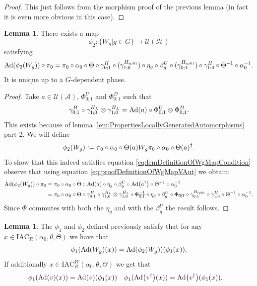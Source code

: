\documentclass[12pt,a4paper,twoside]{article}
\newcommand{\stkout}[1]{\ifmmode\text{\sout{\ensuremath{#1}}}\else\sout{#1}\fi}
\newcommand{\IAC}{\textrm{IAC}}
\newcommand{\defeq}{\vcentcolon=}
\let\originalleft\left
\let\originalright\right
\renewcommand{\left}{\mathopen{}\mathclose\bgroup\originalleft}
\renewcommand{\right}{\aftergroup\egroup\originalright}
\newcommand{\UU}{\mathcal U}
\newcommand{\HH}{\mathcal H}
\renewcommand{\AA}{\mathcal A}
\newcommand{\Ad}[1]{\textrm{Ad}\left(#1\right)}
\theoremstyle{definition}
\newtheorem{lemma}[theorem]{Lemma}
\numberwithin{equation}{section}
\begin{document}
\begin{proof}
	This just follows from the morphism proof of the previous lemma (in fact it is even more obvious in this case).
\end{proof}
\begin{lemma}\label{lem:DefinitionOfWgMap}
	There exists a map
	\begin{equation}
		\phi_2:\{W_g|g\in G\}\rightarrow \UU(\HH)
	\end{equation}
	satisfying
	\begin{equation}\label{eq:lemDefinitionOfWgMapCondition}
		\Ad{\phi_2(W_g)}\circ\pi_0=\pi_0\circ \alpha_0\circ\Theta\circ\gamma^{H}_{0;1}\circ(\gamma^{H_\text{split}}_{1;0})\circ\eta_g\circ\beta_g^U\circ(\gamma^{H_\text{split}}_{0;1})\circ\gamma^{H}_{1;0}\circ\Theta^{-1}\circ\alpha_0^{-1}.
	\end{equation}
	It is unique up to a $G$-dependent phase.
\end{lemma}
\begin{proof}
	Take $a\in\UU(\AA)$, $\Phi^U_{0;1}$ and $\Phi^D_{0;1}$ such that
	\begin{equation}\label{eq:proofDefinitionOfWgMapVAut}
		\gamma^H_{0;1}\circ\gamma^{H_L}_{1;0}\otimes\gamma^{H_L}_{1;0}=\Ad{a}\circ\Phi^U_{0;1}\otimes\Phi^D_{0;1}.
	\end{equation}
	This exists because of lemma \ref{lem:PropertiesLocallyGeneratedAutomorphisms} part 2. We will define
	\begin{equation}
		\phi_2(W_g)\defeq \pi_0\circ\alpha_0\circ\Theta(a)W_g\pi_0\circ\alpha_0\circ\Theta(a)^\dagger.
	\end{equation}
	To show that this indeed satisfies equation \eqref{eq:lemDefinitionOfWgMapCondition} observe that using equation \eqref{eq:proofDefinitionOfWgMapVAut} we obtain:
	\begin{align}
		\Ad{\phi_2(W_g)}\circ\pi_0&=\pi_0\circ \alpha_0\circ\Theta\circ\Ad{a}\circ\eta_g\circ\beta_g^U\circ\Ad{a^{\dagger}}\circ\Theta^{-1}\circ\alpha_0^{-1}\\
		&=\pi_0\circ \alpha_0\circ\Theta\circ\gamma^H_{0;1}\circ\gamma^{H_L}_{1;0}\otimes\gamma^{H_L}_{1;0}\circ\stkout{\Phi_{0;1}^{-1}}\circ\eta_g\circ\beta_g^U\circ\stkout{\Phi_{0;1}}\circ\gamma^{H_\text{split}}_{0;1}\circ\gamma^H_{1;0}\circ\Theta^{-1}\circ\alpha_0^{-1}.
	\end{align}
	Since $\Phi$ commutes with both the $\eta_g$ and with the $\beta_g^U$ the result follows.
\end{proof}
\begin{lemma}\label{lem:phi1phi2matchingCondition}
	The $\phi_1$ and $\phi_2$ defined previously satisfy that for any $x\in\IAC_R(\alpha_0,\theta,\Theta)$ we have that
	\begin{equation}
		\phi_1(\Ad{W_g}(x))=\Ad{\phi_2(W_g)}(\phi_1(x)).
	\end{equation}
	If additionally $x\in\IAC_R^W(\alpha_0,\theta,\Theta)$ we get that
	\begin{align}
		\phi_1(\Ad{v}(x))&=\Ad{v}(\phi_1(x))&\phi_1(\Ad{v^\dagger}(x))&=\Ad{v^\dagger}(\phi_1(x)).
	\end{align}
\end{lemma}
\end{document}
